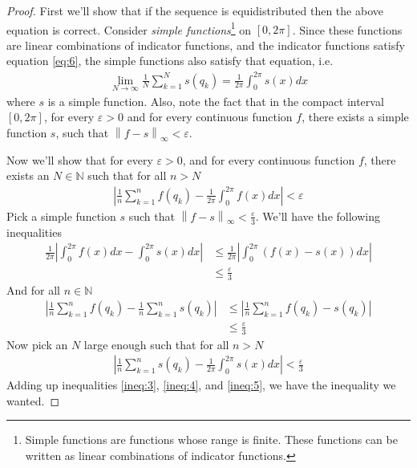 \documentclass[12pt, titlepage]{article}
\theoremstyle{definition}
\newcommand{\vep}{\varepsilon}
\newcommand{\norm}[1]{\left\lVert#1\right\rVert}
\begin{document}
\begin{proof}
    First we'll show that if the sequence is equidistributed then the above equation is correct. Consider \emph{simple functions}\footnote{Simple functions are functions whose range is finite. These functions can be written as linear combinations of indicator functions.} on $[0,2\pi]$. Since these functions are linear combinations of indicator functions, and the indicator functions satisfy equation \ref{eq:6}, the simple functions also satisfy that equation, i.e.
    \begin{align*}
        \lim\limits_{N \to \infty} \frac{1}{N} \sum_{k=1}^{N} s(q_k) = \frac{1}{2\pi} \int_{0}^{2\pi} s(x)dx
    \end{align*}
    where $s$ is a simple function. Also, note the fact that in the compact interval $[0, 2\pi]$, for every $\vep > 0$ and for every continuous function $f$, there exists a simple function $s$, such that $\norm{f - s}_\infty < \vep$.
    
    Now we'll show that for every $\vep >0$, and for every continuous function $f$, there exists an $N \in \mathbb{N}$ such that for all $n > N$
    \begin{align*}
        \left| \frac{1}{n} \sum_{k=1}^{n} f(q_k) - \frac{1}{2\pi} \int_{0}^{2\pi} f(x)dx \right| < \vep
    \end{align*}
    Pick a simple function $s$ such that $\norm{f-s}_\infty < \frac{\vep}{3}$. We'll have the following inequalities
    \begin{align}
        \frac{1}{2\pi}\left| \int_{0}^{2\pi} f(x)dx - \int_{0}^{2\pi} s(x)dx \right| &\leq \frac{1}{2\pi} \left| \int_{0}^{2\pi} (f(x) -s(x))dx \right| \\
        &\leq \frac{\vep}{3} \label{ineq:3}
    \end{align}
    And for all $n \in \mathbb{N}$
    \begin{align}
        \left| \frac{1}{n} \sum_{k=1}^{n} f(q_k) - \frac{1}{n} \sum_{k=1}^{n} s(q_k) \right| &\leq \left| \frac{1}{n} \sum_{k=1}^{n} f(q_k) -s(q_k) \right| \\
        &\leq \frac{\vep}{3} \label{ineq:4}
    \end{align}
    Now pick an $N$ large enough such that for all $n > N$
    \begin{align}
        \left| \frac{1}{n} \sum_{k=1}^{n} s(q_k) - \frac{1}{2\pi} \int_{0}^{2\pi} s(x)dx \right| < \frac{\vep}{3} \label{ineq:5}
    \end{align}
    Adding up inequalities \ref{ineq:3}, \ref{ineq:4}, and \ref{ineq:5}, we have the inequality we wanted.
    

\end{proof}
\end{document}
